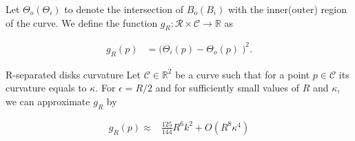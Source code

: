Let $\Theta_o (\Theta_i)$ to denote the intersection of $B_o(B_i)$ with the inner(outer) region of the curve. We define the function $g_R:\mathcal{R} \times \mathcal{C}\rightarrow \mathbb{R}$ as

\begin{align*}
	g_{R}(p) &= \Big( \Theta_i(p) - \Theta_o(p) \;\Big)^2.
\end{align*}

\begin{claim}{R-separated disks curvature}\label{app1:claim:r-separated-disks}
 Let $\mathcal{C} \in \mathbb{R}^2$ be a curve such that for a point $p \in \mathcal{C}$ its curvature equals to $\kappa$. For $\epsilon=R/2$ and for sufficiently small values of $R$ and $\kappa$, we can approximate $g_R$ by



\begin{align*}
g_R(p) \approx & \frac{125}{144}R^6k^2 + O(R^{8}\kappa^4)
\end{align*} 

\end{claim}


